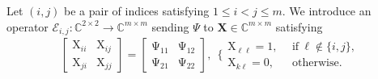 \documentclass[final,onefignum,onetabnum]{siamart190516}
\newcommand{\matr}[1]{\boldsymbol{#1}}
\newcommand{\eqdef}{\stackrel{\sf def}{=}}
\newcommand{\CC}{\mathbb{C}}
\newcommand{\Utwo}{\Psi}
\newcommand{\matrelem}[1]{\mathrm{#1}}
\begin{document}
Let $(i,j)$ be a pair of indices satisfying $1 \le i < j \le m$. 
We introduce an operator $\mathcal{E}_{i,j}: \CC^{2\times 2} \to\CC^{m\times m}$ sending $\Psi$ to $\matr{X} \in \CC^{m\times m}$ satisfying 
 \begin{align*}
\begin{bmatrix}
\matrelem{X}_{ii} &  \matrelem{X}_{ij}\\
\matrelem{X}_{ji}& \matrelem{X}_{jj}
\end{bmatrix}  = \begin{bmatrix}
\matrelem{\Psi}_{11} &  \matrelem{\Psi}_{12}\\
\matrelem{\Psi}_{21}& \matrelem{\Psi}_{22}
\end{bmatrix}, \ \
\bigg\{
\begin{aligned}
\matrelem{X}_{\ell\ell}  = 1,\ \ & \text{if}\ \ell \not\in \{i,j\}, \\
\matrelem{X}_{k\ell} = 0,\ \ & \text{otherwise}. 
\end{aligned}
\end{align*} 
\end{document}

